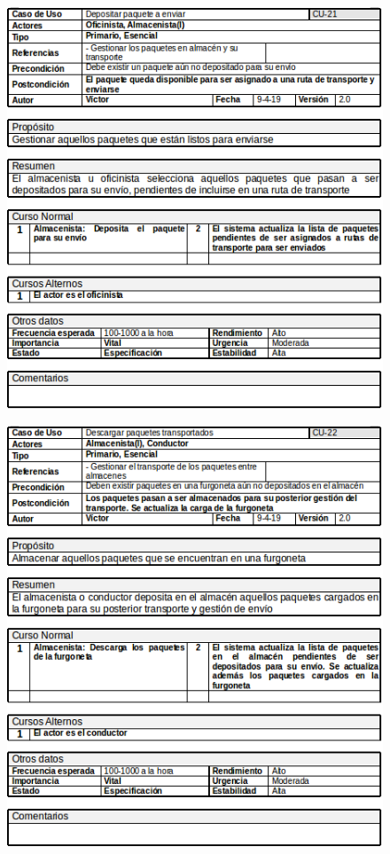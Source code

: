\begin{figure}[H]
	\centering
	\includegraphics[width=16cm]{21}
\end{figure}
\begin{figure}[H]
	\centering
	\includegraphics[width=16cm]{22}
\end{figure}
